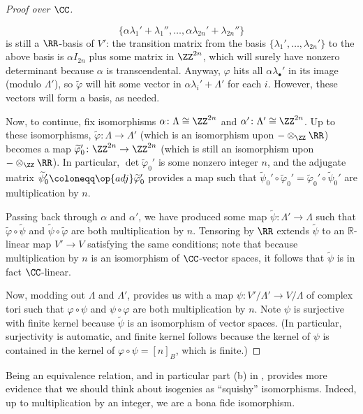 \documentclass[../notes.tex]{subfiles}
\begin{document}
\begin{proof}[Proof over $\CC$]
\begin{itemize}
		\[\{\alpha\lambda_1'+\lambda_1'',\ldots,\alpha\lambda_{2n}'+\lambda_{2n}''\}\]
		is still a $\RR$-basis of $V'$: the transition matrix from the basis $\{\lambda_1',\ldots,\lambda_{2n}'\}$ to the above basis is $\alpha I_{2n}$ plus some matrix in $\ZZ^{2n}$, which will surely have nonzero determinant because $\alpha$ is transcendental. Anyway, $\varphi$ hits all $\alpha\lambda_\bullet'$ in its image (modulo $\Lambda'$), so $\widetilde\varphi$ will hit some vector in $\alpha\lambda_i'+\Lambda'$ for each $i$. However, these vectors will form a basis, as needed.
	\end{itemize}
	Now, to continue, fix isomorphisms $\alpha\colon\Lambda\cong\ZZ^{2n}$ and $\alpha'\colon\Lambda'\cong\ZZ^{2n}$. Up to these isomorphisms, $\widetilde\varphi\colon\Lambda\to\Lambda'$ (which is an isomorphism upon $-\otimes_\ZZ\RR$) becomes a map $\widetilde\varphi_0'\colon\ZZ^{2n}\to\ZZ^{2n}$ (which is still an isomorphism upon $-\otimes_\ZZ\RR$). In particular, $\det\widetilde\varphi_0'$ is some nonzero integer $n$, and the adjugate matrix $\widetilde\psi_0'\coloneqq\op{adj}\widetilde\varphi_0'$ provides a map such that $\widetilde\psi_0'\circ\widetilde\varphi_0'=\widetilde\varphi_0'\circ\widetilde\psi_0'$ are multiplication by $n$.
	
	Passing back through $\alpha$ and $\alpha'$, we have produced some map $\widetilde\psi\colon\Lambda'\to\Lambda$ such that $\widetilde\varphi\circ\widetilde\psi$ and $\widetilde\psi\circ\widetilde\varphi$ are both multiplication by $n$. Tensoring by $\RR$ extends $\widetilde\psi$ to an $\mathbb R$-linear map $V'\to V$ satisfying the same conditions; note that because multiplication by $n$ is an isomorphism of $\CC$-vector spaces, it follows that $\widetilde\psi$ is in fact $\CC$-linear.

	Now, modding out $\Lambda$ and $\Lambda'$,  provides us with a map $\psi\colon V'/\Lambda'\to V/\Lambda$ of complex tori such that $\varphi\circ\psi$ and $\psi\circ\varphi$ are both multiplication by $n$. Note $\psi$ is surjective with finite kernel because $\widetilde\psi$ is an isomorphism of vector spaces. (In particular, surjectivity is automatic, and finite kernel follows because the kernel of $\psi$ is contained in the kernel of $\varphi\circ\psi=[n]_B$, which is finite.)
\end{proof}
\begin{remark}
	Being an equivalence relation, and in particular part (b) in , provides more evidence that we should think about isogenies as ``squishy'' isomorphisms. Indeed, up to multiplication by an integer, we are a bona fide isomorphism.
\end{remark}
\end{document}
